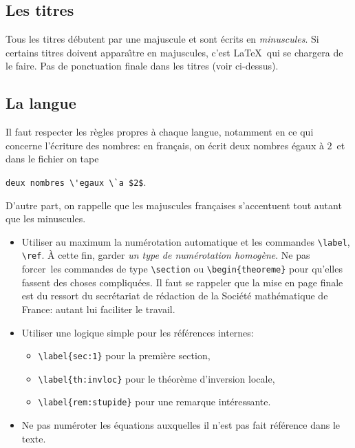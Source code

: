 \documentclass[11pt,francais]{smfart}
\newcommand{\SmF}{Soci\'et\'e ma\-th\'e\-ma\-ti\-que de France}
\begin{document}
\subsection{Les titres}

Tous les titres d\'ebutent par une majuscule et sont \'ecrits
en {\em minuscules}.
Si certains titres doivent appara\^\i tre en majuscules,
c'est \LaTeX\ qui se chargera de le faire.
Pas de ponctuation finale dans les titres (voir ci-dessus).

\subsection{La langue}

Il faut respecter les r\`egles propres \`a chaque langue,
notamment en ce qui concerne l'\'ecriture des nombres:
en fran\c cais, on \'ecrit \og deux nombres \'egaux \`a $2$\fg\ et
dans le fichier on tape

\verb|deux nombres \'egaux \`a $2$|.

\noindent
D'autre part, on rappelle que les majuscules fran\c caises s'accentuent
tout autant que les minuscules.


\begin{itemize}
\item
Utiliser au maximum la num\'erotation automatique et les commandes
\verb|\label|, \verb|\ref|. \`A cette fin, garder {\em un type de
num\'erotation homog\`ene}. Ne pas \og forcer\fg\ les commandes de type
\verb|\section| ou \verb|\begin{theoreme}| pour qu'elles fassent des choses
compliqu\'ees. Il faut se rappeler que la mise en page finale est du
ressort du secr\'etariat de r\'edaction de la \SmF: autant lui faciliter le
travail.

\item
Utiliser une logique simple pour les r\'ef\'erences internes:
\begin{itemize}
\item
\verb|\label{sec:1}| pour la premi\`ere section,

\item
\verb|\label{th:invloc}| pour le th\'eor\`eme d'inversion locale,

\item
\verb|\label{rem:stupide}| pour une remarque int\'eressante.
\end{itemize}

\item
Ne pas num\'eroter les \'equations auxquelles
il n'est pas fait r\'ef\'erence dans le texte.
\end{itemize}
\end{document}
